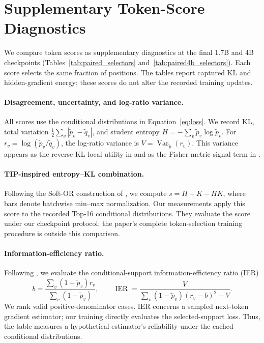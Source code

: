 \section{Supplementary Token-Score Diagnostics}
\label{app:token_scores}
We compare token scores as supplementary diagnostics at the final 1.7B and 4B checkpoints (Tables~\ref{tab:paired_selectors} and~\ref{tab:paired4b_selectors}). Each score selects the same fraction of positions. The tables report captured KL and hidden-gradient energy; these scores do not alter the recorded training updates.

\paragraph{Disagreement, uncertainty, and log-ratio variance.}
All scores use the conditional distributions in Equation~\ref{eq:loss}. We record KL, total variation $\frac12\sum_v|\tilde p_v-\tilde q_v|$, and student entropy $H=-\sum_v\tilde p_v\log\tilde p_v$. For $r_v=\log(\tilde p_v/\tilde q_v)$, the log-ratio variance is $V=\operatorname{Var}_{\tilde p}(r_v)$. This variance appears as the reverse-KL local utility in \citet{sadagopan2026utility} and as the Fisher-metric signal term in \citet{sheng2026ier}.

\paragraph{TIP-inspired entropy--KL combination.}
Following the Soft-OR construction of \citet{xu2026tip}, we compute $s=\bar H+\bar K-\bar H\bar K$, where bars denote batchwise min--max normalization. Our measurements apply this score to the recorded Top-16 conditional distributions. They evaluate the score under our checkpoint protocol; the paper's complete token-selection training procedure is outside this comparison.

\paragraph{Information-efficiency ratio.}
Following \citet{sheng2026ier}, we evaluate the conditional-support information-efficiency ratio (IER)
\begin{equation}
 b=\frac{\sum_v(1-\tilde p_v)r_v}{\sum_v(1-\tilde p_v)},\qquad
 \operatorname{IER}=\frac{V}{\sum_v(1-\tilde p_v)(r_v-b)^2-V}.
\end{equation}
We rank valid positive-denominator cases. IER concerns a sampled next-token gradient estimator; our training directly evaluates the selected-support loss. Thus, the table measures a hypothetical estimator's reliability under the cached conditional distributions.


